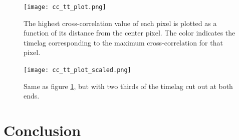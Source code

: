 \documentclass[preprint]{aastex}   %
\begin{document}
\begin{figure}[htb!]
    \texttt{[image: cc\_tt\_plot.png]}
    \caption{The highest cross-correlation value of each pixel is plotted as a function
        of its distance from the center pixel. The color indicates the timelag
        corresponding to the maximum cross-correlation for that pixel.}
    \label{tt_all_plot}
\end{figure}

\begin{figure}[htb!]
    \texttt{[image: cc\_tt\_plot\_scaled.png]}
    \caption{Same as figure \ref{tt_all_plot}, but with two thirds of the timelag cut out
        at both ends.}
    \label{tt_plot}
\end{figure}


\section{Conclusion}\label{conclusion}


\end{document}
